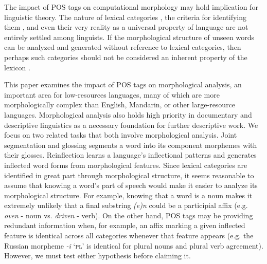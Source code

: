 The impact of POS tags on computational morphology may hold implication for linguistic theory. 
The nature of lexical categories \citep{rauh_syntactic_2010}, the criteria for identifying them  \citep{croft_parts_2000}, and even their very reality as a universal property of language \citep{gil_word_2005} are not entirely settled among linguists. 
If the morphological structure of unseen words can be analyzed and generated without reference to lexical categories, then perhaps such categories should not be considered an inherent property of the lexicon \citep{rauh_linguistic_2016}.

This paper examines the impact of POS tags on morphological analysis, an important area for low-resources languages, many of which are more morphologically complex than English, Mandarin, or other large-resource languages. Morphological analysis also holds high priority in documentary and descriptive linguistics as a necessary foundation for further descriptive work. We focus on two related tasks that both involve morphological analysis. Joint segmentation and glossing segments a word into its component morphemes with their glosses. Reinflection learns a language's inflectional patterns and generates inflected word forms from morphological features. Since lexical categories are identified in great part through morphological structure, it seems reasonable to assume that knowing a word's part of speech would make it easier to analyze its morphological structure. For example, knowing that a word is a noun makes it extremely unlikely that a final substring \textit{(e)n} could be a participial affix (e.g. \textit{oven} - noun vs. \textit{driven} - verb). On the other hand, POS tags may be providing redundant information when, for example, an affix marking a given inflected feature is identical across all categories whenever that feature appears (e.g. the Russian morpheme \textit{-i} `\textsc{pl}' is identical for plural nouns and plural verb agreement). However, we must test either hypothesis before claiming it.

